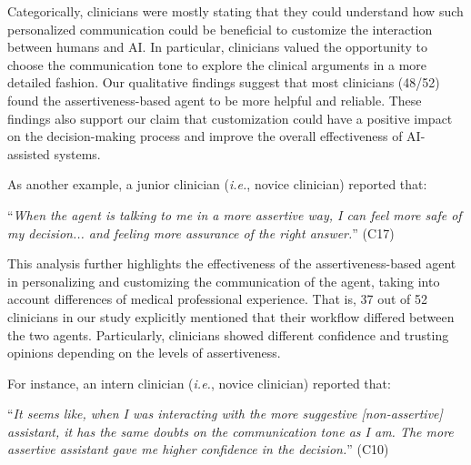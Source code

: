 \vspace{2.5mm}

Categorically, clinicians were mostly stating that they could understand how such personalized communication could be beneficial to customize the interaction between humans and AI.
In particular, clinicians valued the opportunity to choose the communication tone to explore the clinical arguments in a more detailed fashion.
Our qualitative findings suggest that most clinicians (48/52) found the assertiveness-based agent to be more helpful and reliable.
These findings also support our claim that customization could have a positive impact on the decision-making process and improve the overall effectiveness of AI-assisted systems.

\vspace{2.5mm}

\noindent
As another example, a junior clinician ({\it i.e.}, novice clinician) reported that:

\vspace{2.5mm}

\noindent
``{\it When the agent is talking to me in a more assertive way, I can feel more safe of my decision... and feeling more assurance of the right answer.}'' (C17)

\vspace{2.5mm}

This analysis further highlights the effectiveness of the assertiveness-based agent in personalizing and customizing the communication of the agent, taking into account differences of medical professional experience.
That is, 37 out of 52 clinicians in our study explicitly mentioned that their workflow differed between the two agents.
Particularly, clinicians showed different confidence and trusting opinions depending on the levels of assertiveness.

\vspace{2.5mm}

\noindent
For instance, an intern clinician ({\it i.e.}, novice clinician) reported that:

\vspace{2.5mm}

\noindent
``{\it It seems like, when I was interacting with the more suggestive [non-assertive] assistant, it has the same doubts on the communication tone as I am. The more assertive assistant gave me higher confidence in the decision.}'' (C10)

\vspace{2.5mm}

